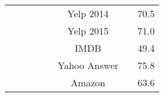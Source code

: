 \documentclass[12pt, a4paper, oneside]{report}
\begin{document}
\begin{tabular}{|c|c|c|c|c|c|cc|}
                                                                          &                       &                                   &                                         &                                                                                                        & Yelp 2014                             & \multicolumn{1}{c|}{}                                                                                                              & 70.5   \\ \cline{6-6} \cline{8-8} 
                                                                          &                       &                                   &                                         &                                                                                                        & Yelp 2015                             & \multicolumn{1}{c|}{}                                                                                                              & 71.0   \\ \cline{6-6} \cline{8-8} 
                                                                          &                       &                                   &                                         &                                                                                                        & IMDB                                  & \multicolumn{1}{c|}{}                                                                                                              & 49.4   \\ \cline{6-6} \cline{8-8} 
                                                                          &                       &                                   &                                         &                                                                                                        & Yahoo Answer                          & \multicolumn{1}{c|}{}                                                                                                              & 75.8   \\ \cline{6-6} \cline{8-8} 
                                                                          &                       &                                   &                                         &                                                                                                        & Amazon                                & \multicolumn{1}{c|}{}                                                                                                              & 63.6   \\ \hline

\end{tabular}
\end{document}
